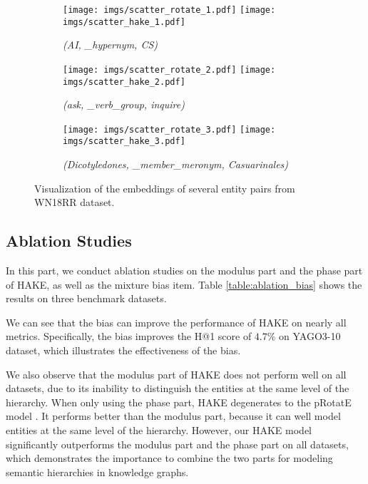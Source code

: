\documentclass[letterpaper]{article} \usepackage{aaai20}  \usepackage{times}  \usepackage{helvet} \usepackage{courier}  \usepackage[hyphens]{url}  \usepackage{graphicx} \urlstyle{rm} \def\UrlFont{\rm}  \usepackage{graphicx}  \frenchspacing  \setlength{\pdfpagewidth}{8.5in}  \setlength{\pdfpageheight}{11in}
\newcommand{\citep}{\cite}
\begin{document}
\begin{figure}[!ht]
  \centering \begin{subfigure}[b]{0.4\textwidth}
  \centering
  \texttt{[image: imgs/scatter\_rotate\_1.pdf]}\hspace{4mm}
  \texttt{[image: imgs/scatter\_hake\_1.pdf]}
  \caption{\textit{(AI, \_hypernym, CS)}}
  \label{fig:scatter_modulus_sub1}
\end{subfigure} 

\vspace{2mm}
\begin{subfigure}[b]{0.4\textwidth}
  \centering
  \texttt{[image: imgs/scatter\_rotate\_2.pdf]}\hspace{4mm}
  \texttt{[image: imgs/scatter\_hake\_2.pdf]}
  \caption{\textit{(ask, \_verb\_group, inquire)}}
  \label{fig:scatter_modulus_sub2}
\end{subfigure} 

\vspace{2mm}
\begin{subfigure}[b]{0.4\textwidth}
  \centering
  \texttt{[image: imgs/scatter\_rotate\_3.pdf]}\hspace{4mm}
  \texttt{[image: imgs/scatter\_hake\_3.pdf]}
  \caption{\textit{(Dicotyledones, \_member\_meronym, Casuarinales)}}
  \label{fig:scatter_modulus_sub3}
\end{subfigure} 
\caption{Visualization of the embeddings of several entity pairs from WN18RR dataset.
}
\label{fig:scatter_modulus}
\end{figure}

\subsection{Ablation Studies}
In this part, we conduct ablation studies on the modulus part and the phase part of HAKE, as well as the mixture bias item.  Table \ref{table:ablation_bias} shows the results on three benchmark datasets.

We can see that the bias can improve the performance of HAKE on nearly all metrics. Specifically, the bias improves the H@1 score of $4.7\%$ on YAGO3-10 dataset, which illustrates the effectiveness of the bias.


We also observe that the modulus part of HAKE does not perform well on all datasets, due to its inability to distinguish the entities at the same level of the hierarchy. When only using the phase part, HAKE degenerates to the pRotatE model \citep{rotate}. It performs better than the modulus part, because it can well model entities at the same level of the hierarchy. However, our HAKE model significantly outperforms the modulus part and the phase part on all datasets, which demonstrates the importance to combine the two parts for modeling semantic hierarchies in knowledge graphs.
\end{document}

